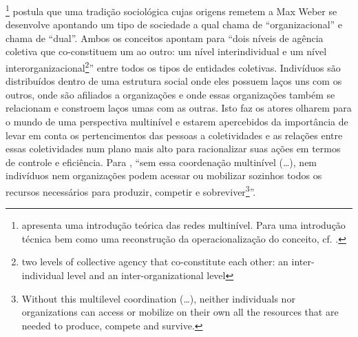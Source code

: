 \documentclass[a4paper, 12pt, openright, oneside, german, french, english, brazil]{abntex2}
\begin{document}
	 \footnote{ apresenta uma introdução teórica das redes multinível. Para uma introdução técnica bem como uma reconstrução da operacionalização do conceito, cf. .} postula que uma tradição sociológica cujas origens remetem a Max Weber se desenvolve apontando um tipo de sociedade a qual  chama de ``organizacional'' e  chama de ``dual''. Ambos os conceitos apontam para ``dois níveis de agência coletiva que co-constituem um ao outro: um nível interindividual e um nível interorganizacional\footnote{two levels of collective agency that co-constitute each other: an inter-individual level and an inter-organizational level}'' \cite[p. 48]{lazega2016synchronization} entre todos os tipos de entidades coletivas. Indivíduos são distribuídos dentro de uma estrutura social onde eles possuem laços uns com os outros, onde são afiliados a organizações e onde essas organizações também se relacionam e constroem laços umas com as outras. Isto faz os atores olharem para o mundo de uma perspectiva multinível e estarem apercebidos da importância de levar em conta os pertencimentos das pessoas a coletividades e as relações entre essas coletividades num plano mais alto para racionalizar suas ações em termos de controle e eficiência. Para , ``sem essa coordenação multinível (\dots), nem indivíduos nem organizações podem acessar ou mobilizar sozinhos todos os recursos necessários para produzir, competir e sobreviver\footnote{Without this multilevel coordination (\dots), neither individuals nor organizations can access or mobilize on their own all the resources that are needed to produce, compete and survive.}''.
	
	
\end{document}

